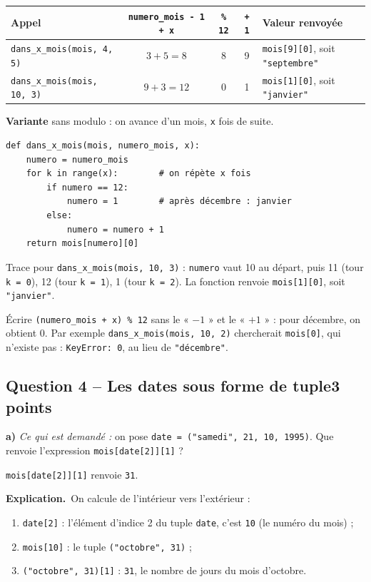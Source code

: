 \documentclass[11pt, a4paper]{exam}
\newcommand{\code}[1]{\texttt{#1}}
\newcommand{\Qt}[2]{\subsection*{#1\hfill{\normalfont\small #2}}}
\newcommand{\rappel}[1]{\noindent\textit{Ce qui est demandé :} #1\par\smallskip}
\newcommand{\explication}{\noindent\textbf{Explication.}\ }
\begin{document}
\begin{center}\footnotesize
\begin{tabular}{|l|c|c|c|l|}\hline
Appel & \code{numero\_mois - 1 + x} & \code{\% 12} & \code{+ 1} & Valeur renvoyée \\\hline
\code{dans\_x\_mois(mois, 4, 5)} & $3 + 5 = 8$ & 8 & 9 & \code{mois[9][0]}, soit \code{"septembre"} \\\hline
\code{dans\_x\_mois(mois, 10, 3)} & $9 + 3 = 12$ & 0 & 1 & \code{mois[1][0]}, soit \code{"janvier"} \\\hline
\end{tabular}
\end{center}

\textbf{Variante} sans modulo : on avance d'un mois, \code{x} fois de suite.
\begin{lstlisting}
def dans_x_mois(mois, numero_mois, x):
    numero = numero_mois
    for k in range(x):        # on répète x fois
        if numero == 12:
            numero = 1        # après décembre : janvier
        else:
            numero = numero + 1
    return mois[numero][0]
\end{lstlisting}
Trace pour \code{dans\_x\_mois(mois, 10, 3)} : \code{numero} vaut 10 au départ, puis 11 (tour \code{k = 0}), 12 (tour \code{k = 1}), 1 (tour \code{k = 2}). La fonction renvoie \code{mois[1][0]}, soit \code{"janvier"}.

\begin{erreur}
Écrire \code{(numero\_mois + x) \% 12} sans le « $-1$ » et le « $+1$ » : pour décembre, on obtient 0. Par exemple \code{dans\_x\_mois(mois, 10, 2)} chercherait \code{mois[0]}, qui n'existe pas : \code{KeyError: 0}, au lieu de \code{"décembre"}.
\end{erreur}

\Qt{Question 4 -- Les dates sous forme de tuple}{3 points}

\textbf{a)} \rappel{on pose \code{date = ("samedi", 21, 10, 1995)}. Que renvoie l'expression \code{mois[date[2]][1]} ?}
\begin{reponse}
\code{mois[date[2]][1]} renvoie \code{31}.
\end{reponse}
\explication On calcule de l'intérieur vers l'extérieur :
\begin{enumerate}
\item \code{date[2]} : l'élément d'indice 2 du tuple \code{date}, c'est \code{10} (le numéro du mois) ;
\item \code{mois[10]} : le tuple \code{("octobre", 31)} ;
\item \code{("octobre", 31)[1]} : \code{31}, le nombre de jours du mois d'octobre.
\end{enumerate}
\end{document}
